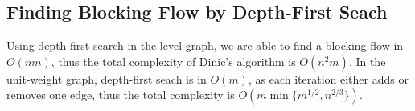 \subsection{Finding Blocking Flow by Depth-First Seach}

Using depth-first search in the level graph, we are able to find a blocking flow in $O(nm)$, thus the total complexity of Dinic's algorithm is $O(n^2 m)$. In the unit-weight graph, depth-first seach is in $O(m)$, as each iteration either adds or removes one edge, thus the total complexity is $O(m \min\{m^{1/2}, n^{2/3}\})$.